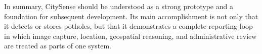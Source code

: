 In summary, CitySense should be understood as a strong prototype and a foundation for subsequent development. Its main accomplishment is not only that it detects or stores potholes, but that it demonstrates a complete reporting loop in which image capture, location, geospatial reasoning, and administrative review are treated as parts of one system.
